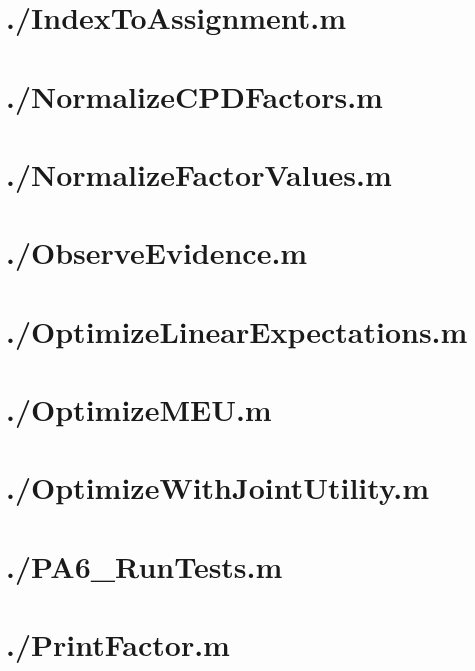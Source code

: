\documentclass{article}
\begin{document}
\section{./IndexToAssignment.m}

\section{./NormalizeCPDFactors.m}

\section{./NormalizeFactorValues.m}

\section{./ObserveEvidence.m}

\section{./OptimizeLinearExpectations.m}

\section{./OptimizeMEU.m}

\section{./OptimizeWithJointUtility.m}

\section{./PA6\_RunTests.m}

\section{./PrintFactor.m}

\end{document}
